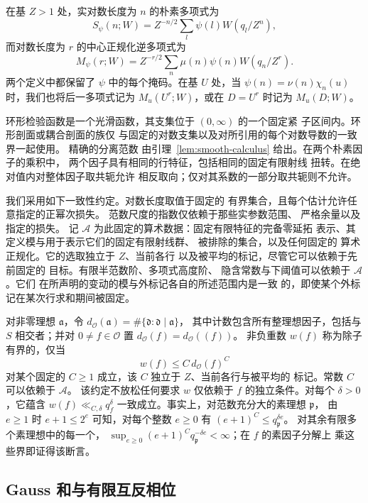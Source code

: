 \documentclass[11pt,a4paper]{article}
\numberwithin{equation}{section}
\numberwithin{figure}{section}
\theoremstyle{definition}
\theoremstyle{remark}
\begin{document}
在基 $Z>1$ 处，实对数长度为 $n$ 的朴素多项式为
\begin{equation}
 S_\psi(n;W)=Z^{-n/2}\sum_l\psi(l)W(q_l/Z^n),
 \label{old-eq:1.1}
\end{equation}
而对数长度为 $r$ 的中心正规化逆多项式为
\begin{equation}
 M_\psi(r;W)=Z^{-r/2}\sum_n\mu(n)\psi(n)W(q_n/Z^r).
 \label{old-eq:1.1a}
\end{equation}
两个定义中都保留了 $\psi$ 中的每个掩码。在基 $U$ 处，当
$\psi(n)=\nu(n)\chi_n(u)$ 时，我们也将后一多项式记为
$M_u(U^r;W)$，或在 $D=U^r$ 时记为 $M_u(D;W)$。

环形检验函数是一个光滑函数，其支集位于 $(0,\infty)$ 的一个固定紧
子区间内。环形剖面或耦合剖面的族仅
与固定的对数支集以及对所引用的每个对数导数的一致界一起使用。
精确的分离范数
由引理~\ref{lem:smooth-calculus} 给出。在两个朴素因子的乘积中，
两个因子具有相同的行特征，包括相同的固定有限射线
扭转。在绝对值内对整体因子取共轭允许
相反取向；仅对其系数的一部分取共轭则不允许。

我们采用如下一致性约定。对数长度取值于固定的
有界集合，且每个估计允许任意指定的正幂次损失。
范数尺度的指数仅依赖于那些实参数范围、
严格余量以及指定的损失。
记 $\mathcal A$ 为此固定的算术数据：固定有限特征的完备零延拓
表示、其定义模与用于表示它们的固定有限射线群、
被排除的集合，以及任何固定的
算术正规化。它的选取独立于 $Z$、当前各行
以及被平均的标记，尽管它可以依赖于先前固定的
目标。有限半范数阶、多项式高度阶、
隐含常数与下阈值可以依赖于 $\mathcal A$。它们
在所声明的变动的模与外标记各自的所述范围内是一致
的，即使某个外标记在某次行求和期间被固定。

对非零理想 $\mathfrak a$，令
$d_{\mathcal O}(\mathfrak a)=\#\{\mathfrak d:\mathfrak d\mid\mathfrak a\}$，
其中计数包含所有整理想因子，包括与
$S$ 相交者；并对 $0\ne f\in\mathcal O$ 置
$d_{\mathcal O}(f)=d_{\mathcal O}((f))$。
非负重数 $w(f)$ 称为除子有界的，仅当
\[
 w(f)\le C\,d_{\mathcal O}(f)^C
\]
对某个固定的 $C\ge1$ 成立，该 $C$ 独立于 $Z$、当前各行与被平均的
标记。常数 $C$ 可以依赖于 $\mathcal A$。
该约定不放松任何要求 $w$ 仅依赖于
$f$ 的独立条件。对每个 $\delta>0$，它蕴含 $w(f)\ll_{C,\delta}q_f^\delta$
一致成立。事实上，对范数充分大的素理想 $\mathfrak p$，
由 $e\ge1$ 时 $e+1\le2^e$ 可知，对每个整数 $e\ge0$ 有 $(e+1)^C\le q_{\mathfrak p}^{\delta e}$。
对其余有限多个素理想中的每一个，
$\sup_{e\ge0}(e+1)^Cq_{\mathfrak p}^{-\delta e}<\infty$；在 $f$ 的素因子分解上
乘这些界即证得该断言。

\subsection{Gauss 和与有限互反相位}
\end{document}

